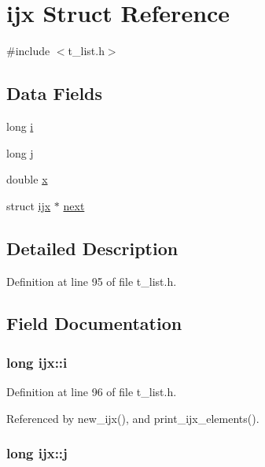 \hypertarget{structijx}{\section{ijx Struct Reference}
\label{structijx}
}


{\ttfamily \#include $<$t\-\_\-list.\-h$>$}

\subsection*{Data Fields}
\begin{DoxyCompactItemize}
\item 
long \hyperlink{structijx_a0427a1e78b3cdd7c9e5f4e9261f5f5dd}{i}
\item 
long \hyperlink{structijx_a15f1a49fb967527b2a20a1cae9b1502e}{j}
\item 
double \hyperlink{structijx_a2755acb599af9a8ece442b3f8e572500}{x}
\item 
struct \hyperlink{structijx}{ijx} $\ast$ \hyperlink{structijx_a0730f1502a3d1cc7336b9e6db1360aef}{next}
\end{DoxyCompactItemize}


\subsection{Detailed Description}


Definition at line 95 of file t\-\_\-list.\-h.



\subsection{Field Documentation}
\hypertarget{structijx_a0427a1e78b3cdd7c9e5f4e9261f5f5dd}{
\subsubsection[{i}]{\setlength{\rightskip}{0pt plus 5cm}long ijx\-::i}}\label{structijx_a0427a1e78b3cdd7c9e5f4e9261f5f5dd}


Definition at line 96 of file t\-\_\-list.\-h.



Referenced by new\-\_\-ijx(), and print\-\_\-ijx\-\_\-elements().

\hypertarget{structijx_a15f1a49fb967527b2a20a1cae9b1502e}{
\subsubsection[{j}]{\setlength{\rightskip}{0pt plus 5cm}long ijx\-::j}}\label{structijx_a15f1a49fb967527b2a20a1cae9b1502e}


